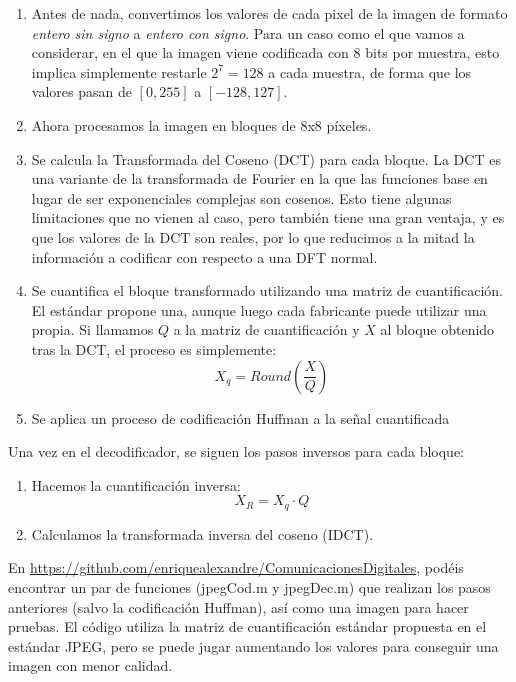 \documentclass[es,practica]{uah}
\begin{document}
\begin{enumerate}
\begin{enumerate}
\item Antes de nada, convertimos los valores de cada pixel de la imagen de formato \emph{entero sin signo} a \emph{entero con signo}. Para un caso como el que vamos a considerar, en el que la imagen viene codificada con 8 bits por muestra, esto implica simplemente restarle $2^7 = 128$ a cada muestra, de forma que los valores pasan de $[0, 255]$ a $[-128, 127]$.
\item Ahora procesamos la imagen en bloques de 8x8 píxeles.
\item Se calcula la Transformada del Coseno (DCT) para cada bloque. La DCT es una variante de la transformada de Fourier en la que las funciones base en lugar de ser exponenciales complejas son cosenos. Esto tiene algunas limitaciones que no vienen al caso, pero también tiene una gran ventaja, y es que los valores de la DCT son reales, por lo que reducimos a la mitad la información a codificar con respecto a una DFT normal.
\item Se cuantifica el bloque transformado utilizando una matriz de cuantificación. El estándar propone una, aunque luego cada fabricante puede utilizar una propia. Si llamamos $Q$ a la matriz de cuantificación y $X$ al bloque obtenido tras la DCT, el proceso es simplemente:
\begin{equation}
	X_q = Round \left ( \frac{X}{Q} \right )
\end{equation}
\item Se aplica un proceso de codificación Huffman a la señal cuantificada
\end{enumerate}

Una vez en el decodificador, se siguen los pasos inversos para cada bloque:

\begin{enumerate}
\item Hacemos la cuantificación inversa:
\begin{equation}
	X_R = X_q \cdot Q
\end{equation}
\item Calculamos la transformada inversa del coseno (IDCT).
\end{enumerate}

En \url{https://github.com/enriquealexandre/ComunicacionesDigitales}, podéis encontrar un par de funciones (jpegCod.m y jpegDec.m) que realizan los pasos anteriores (salvo la codificación Huffman), así como una imagen para hacer pruebas. El código utiliza la matriz de cuantificación estándar propuesta en el estándar JPEG, pero se puede jugar aumentando los valores para conseguir una imagen con menor calidad. 


\end{enumerate}
\end{document}
